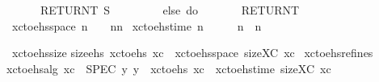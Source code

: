 {    \ \ \ \ \ \ RETURNT\ S{\isacharprime}{\kern0pt}\isanewline
    \ \ \ \ {\isacharbraceright}{\kern0pt}\isanewline
    \ \ \ \ else\ do\ {\isacharbraceleft}{\kern0pt}\isanewline
    \ \ \ \ \ \ RETURNT\ {\isacharbraceleft}{\kern0pt}{\isacharbraceleft}{\kern0pt}{\isacharbraceright}{\kern0pt}{\isacharbraceright}{\kern0pt}\isanewline
    \ \ \ \ {\isacharbraceright}{\kern0pt}\isanewline
    \ \ {\isacharbraceright}{\kern0pt}\isanewline
    {\isachardoublequoteclose}\isanewline
    \isanewline
    \isamarkupfalse%
    \ {\isachardoublequoteopen}xc{\isacharunderscore}{\kern0pt}to{\isacharunderscore}{\kern0pt}ehs{\isacharunderscore}{\kern0pt}space\ n\ {\isasymequiv}\ {}\ {\isacharplus}{\kern0pt}\ n{\isacharasterisk}{\kern0pt}n{\isachardoublequoteclose}\isanewline
    \isamarkupfalse%
    \ {\isachardoublequoteopen}xc{\isacharunderscore}{\kern0pt}to{\isacharunderscore}{\kern0pt}ehs{\isacharunderscore}{\kern0pt}time\ n\ {\isasymequiv}\ {}\ {\isacharplus}{\kern0pt}\ {}\ {\isacharasterisk}{\kern0pt}\ n\ {\isacharasterisk}{\kern0pt}\ n{\isachardoublequoteclose}\isanewline

    \isamarkupfalse%
\ xc{\isacharunderscore}{\kern0pt}to{\isacharunderscore}{\kern0pt}ehs{\isacharunderscore}{\kern0pt}size{\isacharcolon}{\kern0pt}\isanewline
{\isachardoublequoteopen}size{\isacharunderscore}{\kern0pt}ehs\ {\isacharparenleft}{\kern0pt}xc{\isacharunderscore}{\kern0pt}to{\isacharunderscore}{\kern0pt}ehs\ xc{\isacharparenright}{\kern0pt}\ {\isasymle}\ xc{\isacharunderscore}{\kern0pt}to{\isacharunderscore}{\kern0pt}ehs{\isacharunderscore}{\kern0pt}space\ {\isacharparenleft}{\kern0pt}size{\isacharunderscore}{\kern0pt}XC\ xc{\isacharparenright}{\kern0pt}{\isachardoublequoteclose}\isanewline
%
\isamarkupfalse%
\ xc{\isacharunderscore}{\kern0pt}to{\isacharunderscore}{\kern0pt}ehs{\isacharunderscore}{\kern0pt}refines{\isacharcolon}{\kern0pt}\isanewline
{\isachardoublequoteopen}xc{\isacharunderscore}{\kern0pt}to{\isacharunderscore}{\kern0pt}ehs{\isacharunderscore}{\kern0pt}alg\ xc\ {\isasymle}\ SPEC\ {\isacharparenleft}{\kern0pt}{\isasymlambda}y{\isachardot}{\kern0pt}\ y\ {\isacharequal}{\kern0pt}\ xc{\isacharunderscore}{\kern0pt}to{\isacharunderscore}{\kern0pt}ehs\ xc{\isacharparenright}{\kern0pt}\ {\isacharparenleft}{\kern0pt}{\isasymlambda}{\isacharunderscore}{\kern0pt}{\isachardot}{\kern0pt}\ xc{\isacharunderscore}{\kern0pt}to{\isacharunderscore}{\kern0pt}ehs{\isacharunderscore}{\kern0pt}time\ {\isacharparenleft}{\kern0pt}size{\isacharunderscore}{\kern0pt}XC\ xc{\isacharparenright}{\kern0pt}{\isacharparenright}{\kern0pt}{\isachardoublequoteclose}
%
}

